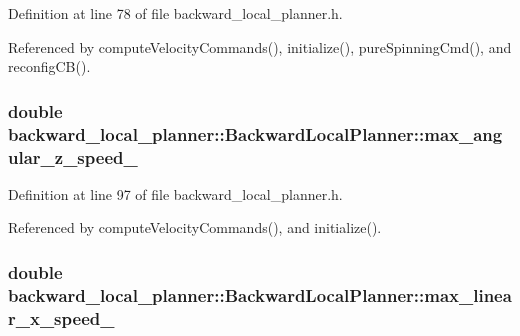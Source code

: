 Definition at line 78 of file backward\+\_\+local\+\_\+planner.\+h.



Referenced by compute\+Velocity\+Commands(), initialize(), pure\+Spinning\+Cmd(), and reconfig\+C\+B().

\subsubsection[{\texorpdfstring{max\+\_\+angular\+\_\+z\+\_\+speed\+\_\+}{max_angular_z_speed_}}]{\setlength{\rightskip}{0pt plus 5cm}double backward\+\_\+local\+\_\+planner\+::\+Backward\+Local\+Planner\+::max\+\_\+angular\+\_\+z\+\_\+speed\+\_\+\hspace{0.3cm}{\ttfamily [private]}}\hypertarget{classbackward__local__planner_1_1BackwardLocalPlanner_a737a0163525aae9afb44bd17f9e013ad}{}\label{classbackward__local__planner_1_1BackwardLocalPlanner_a737a0163525aae9afb44bd17f9e013ad}


Definition at line 97 of file backward\+\_\+local\+\_\+planner.\+h.



Referenced by compute\+Velocity\+Commands(), and initialize().

\subsubsection[{\texorpdfstring{max\+\_\+linear\+\_\+x\+\_\+speed\+\_\+}{max_linear_x_speed_}}]{\setlength{\rightskip}{0pt plus 5cm}double backward\+\_\+local\+\_\+planner\+::\+Backward\+Local\+Planner\+::max\+\_\+linear\+\_\+x\+\_\+speed\+\_\+\hspace{0.3cm}{\ttfamily [private]}}\hypertarget{classbackward__local__planner_1_1BackwardLocalPlanner_a649fccd71e53ae248ee2f51506e381d2}{}\label{classbackward__local__planner_1_1BackwardLocalPlanner_a649fccd71e53ae248ee2f51506e381d2}


